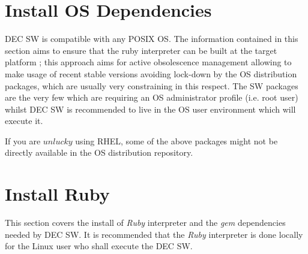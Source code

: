 \documentclass[dec_sum_main.tex]{subfiles}
\begin{document}
\section{Install OS Dependencies}
 DEC SW is compatible with any POSIX OS. The information contained in this section aims to ensure that the ruby interpreter can be built at the target platform ; this approach aims for active obsolescence management allowing to make usage of recent stable versions avoiding lock-down by the OS distribution packages, which are usually very constraining in this respect. The SW packages are the very few which are requiring an OS administrator profile (i.e. root user) whilst DEC SW is recommended to live in the OS user environment which will execute it.\newline
 
 \par
 \noindent
   \newline 
   \newline
   \newline
   \newline
   \newline
   \newline
   \newline
   \newline
   \newline
   \newline

If you are \(unlucky\) using RHEL, some of the above packages might not be directly available in the OS distribution repository.


\section{Install Ruby}
 This section covers the install of \textit{Ruby} interpreter and the \textit{gem} dependencies needed by DEC SW. It is recommended that the \textit{Ruby} interpreter is done locally for the Linux user who shall execute the DEC SW.\newline
\end{document}
